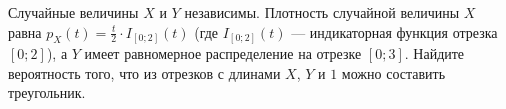 \documentclass{article}
\begin{document}
Случайные величины $X$ и $Y$ независимы. Плотность случайной величины $X$ равна
$p_X (t) = \frac{t}{2} \cdot I_{[0;2]} (t)$ (где $I_{[0;2]} (t)$ --- индикаторная функция отрезка $[0;2]$), а $Y$ имеет равномерное распределение на отрезке $[0;3]$.
Найдите вероятность того, что из отрезков с длинами $X$, $Y$ и $1$ можно составить треугольник.
\end{document}

